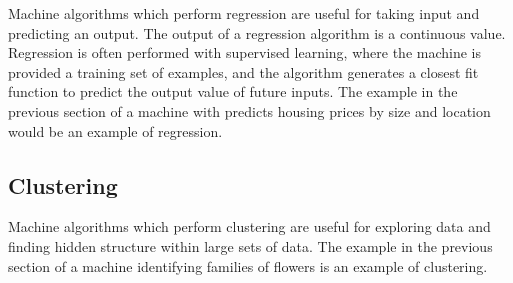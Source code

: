 Machine algorithms which perform regression are useful for taking input and predicting an output. The output of a regression algorithm is a continuous value. Regression is often performed with supervised learning, where the machine is provided a training set of examples, and the algorithm generates a closest fit function to predict the output value of future inputs. The example in the previous section of a machine with predicts housing prices by size and location would be an example of regression.


\subsection{Clustering} %

Machine algorithms which perform clustering are useful for exploring data and finding hidden structure within large sets of data. The example in the previous section of a machine identifying families of flowers is an example of clustering.

